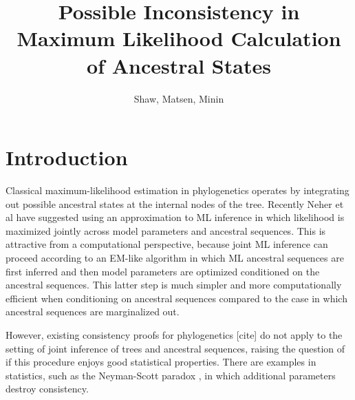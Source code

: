 \documentclass[a4paper]{article}
\title{Possible Inconsistency in Maximum Likelihood Calculation of Ancestral States}
\author{Shaw, Matsen, Minin}
\begin{document}
\maketitle


\renewcommand{\arraystretch}{1.2} %


\section*{Introduction}

Classical maximum-likelihood estimation in phylogenetics operates by integrating out possible ancestral states at the internal nodes of the tree.
Recently Neher et al have suggested using an approximation to ML inference in which likelihood is maximized jointly across model parameters and ancestral sequences.
This is attractive from a computational perspective, because joint ML inference can proceed according to an EM-like algorithm in which ML ancestral sequences are first inferred and then model parameters are optimized conditioned on the ancestral sequences.
This latter step is much simpler and more computationally efficient when conditioning on ancestral sequences compared to the case in which ancestral sequences are marginalized out.

However, existing consistency proofs for phylogenetics [cite] do not apply to the setting of joint inference of trees and ancestral sequences, raising the question of if this procedure enjoys good statistical properties.
There are examples in statistics, such as the Neyman-Scott paradox \cite{Neyman1948-tt}, in which additional parameters destroy consistency.
\end{document}
